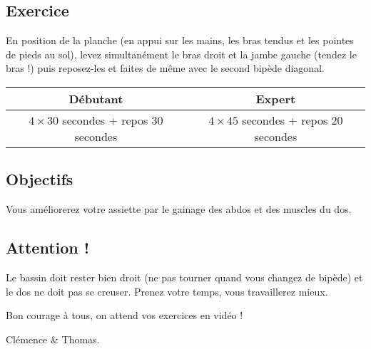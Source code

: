 \documentclass[12pt,a4paper]{article}
\subtitle{Fiche \no 3 -- Planche dynamique}
\begin{document}
\maketitle




\subsection*{Exercice}
	En position de la planche (en appui sur les mains, les bras tendus et les pointes de pieds au sol), levez simultanément le bras droit et la jambe gauche (tendez le bras !) puis reposez-les et faites de même avec le second bipède diagonal.

	\begin{center}
		\begin{tabular}{c|c}
			\textbf{Débutant} & \textbf{Expert} \\
			\hline
			$4\times 30$ secondes + repos 30 secondes & $4\times45$ secondes + repos 20 secondes \\
		\end{tabular}
	\end{center}

\subsection*{Objectifs}
	Vous améliorerez votre assiette par le gainage des abdos et des muscles du dos.

\subsection*{Attention !}
	Le bassin doit rester bien droit (ne pas tourner quand vous changez de bipède) et le dos ne doit pas se creuser. Prenez votre temps, vous travaillerez mieux.

\vfill
\begin{flushright}
	Bon courage à tous, on attend vos exercices en vidéo ! \phantom{Clémence et Thomas}

	Clémence \& Thomas.
\end{flushright}
\end{document}
